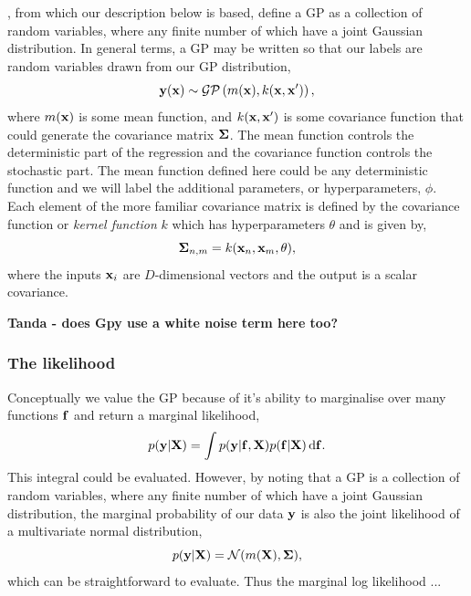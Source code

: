 \citet{williams1996gaussian}, from which our description below is based,  define a GP as a collection of random variables, where any finite number of which have a joint Gaussian distribution.  In general terms,  a GP may be written so that our labels are random variables drawn from our GP distribution, 
\begin{equation}
{\bf y}({\bf x}) \sim \mathcal{GP}\left( m({\bf x}),  k({\bf x}, {\bf x'})\right),
\end{equation}
where $m({\bf x})$ is some mean function, and $k({\bf x}, {\bf x'})$ is some covariance function that could generate the covariance matrix $\bf \Sigma$.  The mean function controls the deterministic part of the regression and the covariance function controls the stochastic part.  The mean function defined here could be any deterministic function and we will label the additional parameters, or hyperparameters, $\phi$.  Each element of the more familiar covariance matrix is defined by the covariance function or {\it kernel function} $k$ which has hyperparameters $\theta$ and is given by,
\begin{equation}
{\bf \Sigma}_{n, m} = k({\bf x}_{n}, {\bf x}_{m},  \theta),
\end{equation}
where the inputs ${\bf x}_{i}$ are $D$-dimensional vectors and the output is a scalar covariance.

{\bf Tanda - does Gpy use a white noise term here too?}

\subsubsection{The likelihood}
Conceptually we value the GP because of it's ability to marginalise over many functions $\bf f$ and return a marginal likelihood,
\begin{equation}
p({\bf y} | {\bf X}) = \int p({\bf y} | {\bf f}, {\bf X}) p({\bf f} | {\bf X}) \, {\rm d}{\bf f}.
\end{equation}
This integral could be evaluated.  However, by noting that a GP is a collection of random variables, where any finite number of which have a joint Gaussian distribution, the marginal probability of our data $\bf y$ is also the joint likelihood of a multivariate normal distribution,
\begin{equation}
p({\bf y} | {\bf X}) = \mathcal{N}(m({\bf X}), {\bf \Sigma}),
\end{equation}
which can be straightforward to evaluate.  Thus the marginal log likelihood ... 

